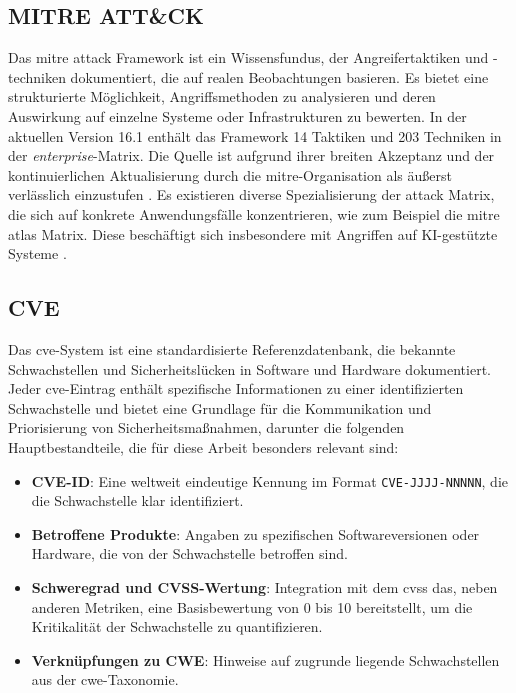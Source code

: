 \subsection{MITRE ATT\&CK}
Das \gls{mitre} \gls{attack} Framework ist ein Wissensfundus, der Angreifertaktiken und -techniken dokumentiert, die auf realen Beobachtungen basieren. Es bietet eine strukturierte Möglichkeit, Angriffsmethoden zu analysieren und deren Auswirkung auf einzelne Systeme oder Infrastrukturen zu bewerten. In der aktuellen Version 16.1 enthält das Framework 14 Taktiken und 203 Techniken in der \textit{enterprise}-Matrix. Die Quelle ist aufgrund ihrer breiten Akzeptanz und der kontinuierlichen Aktualisierung durch die \gls{mitre}-Organisation als äußerst verlässlich einzustufen \autocite{MITREATTCK}. Es existieren diverse Spezialisierung der \gls{attack} Matrix, die sich auf konkrete Anwendungsfälle konzentrieren, wie zum Beispiel die \gls{mitre} \gls{atlas} Matrix. Diese beschäftigt sich insbesondere mit Angriffen auf KI-gestützte Systeme \autocite{ATLASMatrixMITRE}.

\subsection{CVE}
\label{bg:cve}
Das \gls{cve}-System ist eine standardisierte Referenzdatenbank, die bekannte Schwachstellen und Sicherheitslücken in Software und Hardware dokumentiert. Jeder \gls{cve}-Eintrag enthält spezifische Informationen zu einer identifizierten Schwachstelle und bietet eine Grundlage für die Kommunikation und Priorisierung von Sicherheitsmaßnahmen, darunter die folgenden Hauptbestandteile, die für diese Arbeit besonders relevant sind:

\begin{itemize}
    \item \textbf{CVE-ID}: Eine weltweit eindeutige Kennung im Format \texttt{CVE-JJJJ-NNNNN}, die die Schwachstelle klar identifiziert.
    \item \textbf{Betroffene Produkte}: Angaben zu spezifischen Softwareversionen oder Hardware, die von der Schwachstelle betroffen sind.
    \item \textbf{Schweregrad und CVSS-Wertung}: Integration mit dem \gls{cvss} das, neben anderen Metriken, eine Basisbewertung von 0 bis 10 bereitstellt, um die Kritikalität der Schwachstelle zu quantifizieren.
    \item \textbf{Verknüpfungen zu CWE}: Hinweise auf zugrunde liegende Schwachstellen aus der \gls{cwe}-Taxonomie.
\end{itemize}

